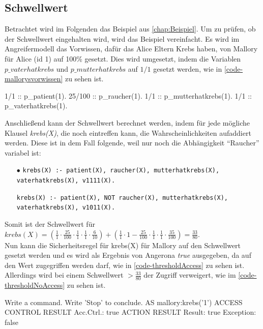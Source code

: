 \documentclass[german,version-2020-11]{uzl-thesis}
\begin{document}
\subsection{Schwellwert}\label{sub:schwellwert}
Betrachtet wird im Folgenden das Beispiel aus \autoref{chap:Beispiel}. Um zu prüfen, ob der Schwellwert eingehalten wird, wird das Beispiel vereinfacht. Es wird im Angreifermodell das Vorwissen, dafür das Alice Eltern Krebs haben, von Mallory für Alice (id 1) auf 100\% gesetzt. Dies wird umgesetzt, indem die Variablen $p\_vaterhatkrebs$ und $p\_mutterhatkrebs$ auf $1/1$ gesetzt werden, wie in \autoref{code-mallorysvorwissen} zu sehen ist.
\begin{Pseudocode}[caption={Mallorys Vorwissen}, label={code-mallorysvorwissen}]
1/1 :: p_patient(1).
25/100 :: p_raucher(1).
1/1 :: p_mutterhatkrebs(1).
1/1 :: p_vaterhatkrebs(1).
\end{Pseudocode}
Anschließend kann der Schwellwert berechnet werden, indem für jede mögliche Klausel \textit{krebs(X)}, die noch eintreffen kann, die Wahrscheinlichkeiten aufaddiert werden. Diese ist in dem Fall folgende, weil nur noch die Abhängigkeit \enquote{Raucher} variabel ist:
\begin{itemize}
	\item[$\bullet$] \texttt{krebs(X) :- patient(X), raucher(X), mutterhatkrebs(X), vaterhatkrebs(X), v1111(X).}
	\item[\bullet] \texttt{krebs(X) :- patient(X), NOT raucher(X), mutterhatkrebs(X), vaterhatkrebs(X), v1011(X).}
\end{itemize}
Somit ist der Schwellwert für $krebs(X) = (\frac{1}{1} \cdot \frac{25}{100} \cdot \frac{1}{1} \cdot \frac{1}{1} \cdot \frac{6}{10}) + (\frac{1}{1} \cdot 1- \frac{25}{100} \cdot \frac{1}{1} \cdot \frac{1}{1} \cdot \frac{35}{100}) = \frac{33}{80} $. \\  Nun kann die Sicherheitsregel für krebs(X) für Mallory auf den Schwellwert gesetzt werden und es wird als Ergebnis von Angerona \textit{true} ausgegeben, da auf den Wert zugegriffen werden darf, wie in \autoref{code-thresholdAccess} zu sehen ist. Allerdings wird bei einem Schwellwert $ > \frac{33}{80}$ der Zugriff verweigert, wie im \autoref{code-thresholdNoAccess} zu sehen ist. 


\begin{Pseudocode}[caption={Angerona Ergebnis für Schwellwert=$\frac{33}{80}$}, label={code-thresholdAccess}]
Write a command. Write 'Stop' to conclude.
AS mallory:krebs('1')
ACCESS CONTROL RESULT
	Acc.Ctrl.: true
ACTION RESULT
	Result: true Exception: false
\end{Pseudocode}
\end{document}
